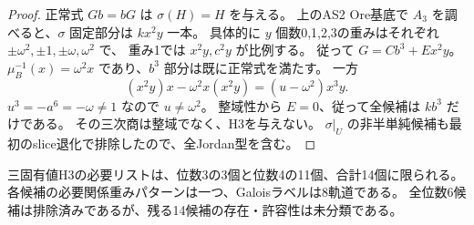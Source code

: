 \begin{proof}
正常式 $Gb=bG$ は $\sigma(H)=H$ を与える。
上のAS2 Ore基底で $A_3$ を調べると、$\sigma$ 固定部分は $kx^2y$ 一本。
具体的に $y$ 個数0,1,2,3の重みはそれぞれ $\pm\omega^2,\pm1,\pm\omega,\omega^2$ で、
重み1では $x^2y,c^2y$ が比例する。
従って $G=C b^3+E x^2y$。
$\mu_B^{-1}(x)=\omega^2x$ であり、$b^3$ 部分は既に正常式を満たす。
一方
\[
 (x^2y)x-\omega^2x(x^2y)=(u-\omega^2)x^3y.
\]
$u^3=-a^6=-\omega\ne1$ なので $u\ne\omega^2$。
整域性から $E=0$、従って全候補は $kb^3$ だけである。
その三次商は整域でなく、H3を与えない。
$\sigma|_U$ の非半単純候補も最初のslice退化で排除したので、全Jordan型を含む。
\end{proof}

\begin{corollary}[三固有値領域の現在の必要被覆]
\label{cor:cubic-three-eigenvalue-14-list}
三固有値H3の必要リストは、位数3の3個と位数4の11個、合計14個に限られる。
各候補の必要関係重みパターンは一つ、Galoisラベルは8軌道である。
全位数6候補は排除済みであるが、残る14候補の存在・許容性は未分類である。
\end{corollary}
